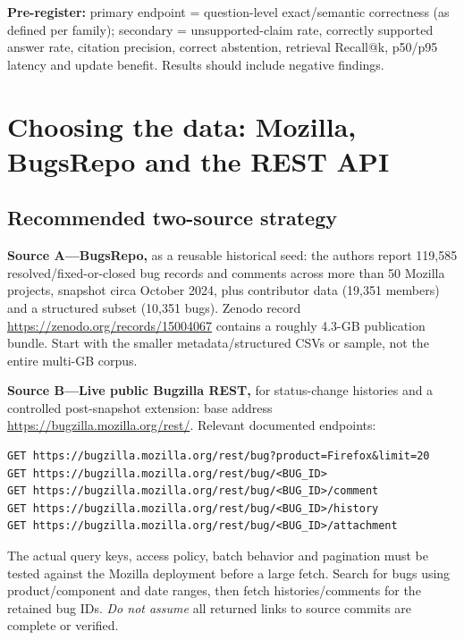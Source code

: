 \documentclass[11pt,a4paper]{article}
\begin{document}
\textbf{Pre-register:} primary endpoint = question-level exact/semantic correctness (as defined per family); secondary = unsupported-claim rate, correctly supported answer rate, citation precision, correct abstention, retrieval Recall@k, p50/p95 latency and update benefit. Results should include negative findings.

\section{Choosing the data: Mozilla, BugsRepo and the REST API}
\subsection{Recommended two-source strategy}
\textbf{Source A---BugsRepo,} as a reusable historical seed: the authors report 119,585 resolved/fixed-or-closed bug records and comments across more than 50 Mozilla projects, snapshot circa October 2024, plus contributor data (19,351 members) and a structured subset (10,351 bugs)\cite{bugsrepo}. Zenodo record \url{https://zenodo.org/records/15004067} contains a roughly 4.3-GB publication bundle. Start with the smaller metadata/structured CSVs or sample, not the entire multi-GB corpus.

\textbf{Source B---Live public Bugzilla REST,} for status-change histories and a controlled post-snapshot extension: base address \url{https://bugzilla.mozilla.org/rest/}. Relevant documented endpoints\cite{bugzillaapi}:
\begin{lstlisting}
GET https://bugzilla.mozilla.org/rest/bug?product=Firefox&limit=20
GET https://bugzilla.mozilla.org/rest/bug/<BUG_ID>
GET https://bugzilla.mozilla.org/rest/bug/<BUG_ID>/comment
GET https://bugzilla.mozilla.org/rest/bug/<BUG_ID>/history
GET https://bugzilla.mozilla.org/rest/bug/<BUG_ID>/attachment
\end{lstlisting}
The actual query keys, access policy, batch behavior and pagination must be tested against the Mozilla deployment before a large fetch. Search for bugs using product/component and date ranges, then fetch histories/comments for the retained bug IDs. \emph{Do not assume} all returned links to source commits are complete or verified.
\end{document}
